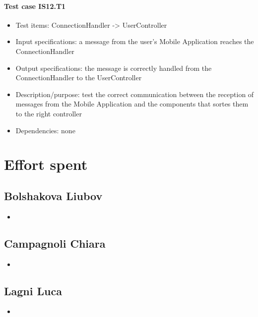 \documentclass[a4paper,leqno]{article}
\begin{document}
\paragraph{Test case IS12.T1}
\begin{itemize}
	\item Test items: ConnectionHandler -> UserController
	\item Input specifications: a message from the user's Mobile Application reaches the ConnectionHandler
	\item Output specifications: the message is correctly handled from the ConnectionHandler to the UserController
	\item Description/purpose: test the correct communication between the reception of messages from the Mobile Application and the components that sortes them to the right controller
	\item Dependencies: none
\end{itemize}

\newpage
\section{Effort spent}
\subsection{Bolshakova Liubov}
\begin{itemize}
	\item 
\end{itemize}
\subsection{Campagnoli Chiara}
\begin{itemize}
	\item 
\end{itemize}
\subsection{Lagni Luca}
\begin{itemize}
	\item 
\end{itemize}

	
\end{document}
